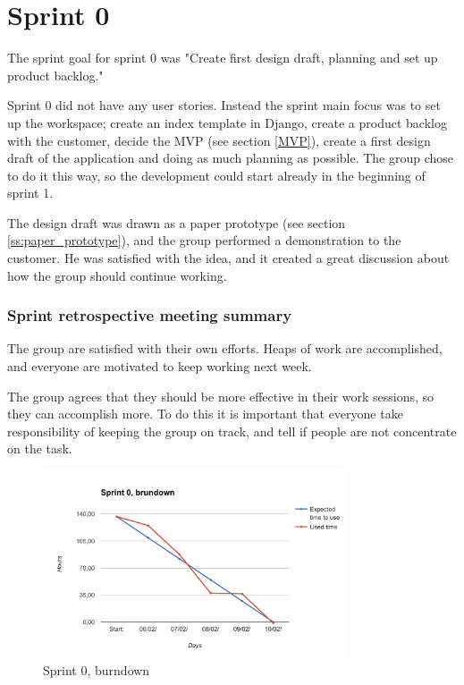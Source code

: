 \section{Sprint 0}
\label{sprint0}
The sprint goal for sprint 0 was "Create first design draft, planning and set up product backlog."

Sprint 0 did not have any user stories. Instead the sprint main focus was to set up the workspace; create an index template in Django, create a product backlog with the customer, decide the MVP (see section \ref{MVP}), create a first design draft of the application and doing as much planning as possible. The group chose to do it this way, so the development could start already in the beginning of sprint 1.

The design draft was drawn as a paper prototype (see section \ref{ss:paper_prototype}), and the group performed a demonstration to the customer. He was satisfied with the idea, and it created a great discussion about how the group should continue working.

\subsubsection{Sprint retrospective meeting summary}
The group are satisfied with their own efforts. Heaps of work are accomplished, and everyone are motivated to keep working next week.
    
The group agrees that they should be more effective in their work sessions, so they can accomplish more. To do this it is important that everyone take responsibility of keeping the group on track, and tell if people are not concentrate on the task.

\begin{figure}[ht]
\centering
    \includegraphics[width=0.8\textwidth]{fig/sprint0}
\caption{Sprint 0, burndown}
\end{figure}

